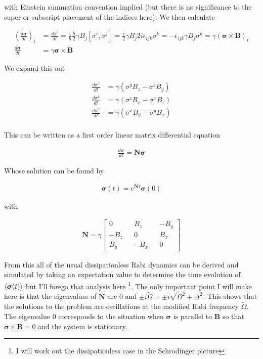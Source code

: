 \documentclass[12pt]{article}
\newcommand{\ddt}[1]{\frac{d #1}{dt}}
\newcommand{\bv}[1]{\boldsymbol{#1}}
\begin{document}
with Einstein summation convention implied (but there is no significance to the super or subscript placement of the indices here). We then calculate

\begin{align}
\left(\ddt{\bv{\sigma}}\right)_i &= \ddt{\sigma^i} = \frac{i}{\hbar}\frac{\hbar}{2}\gamma B_j [\sigma^i,\sigma^j] = \frac{i}{2} \gamma B_j 2i \epsilon_{ijk} \sigma^k = -\epsilon_{ijk} \gamma B_j  \sigma^k = \gamma\left(\bv{\sigma} \times \bv{B} \right)_i\\
\ddt{\bv{\sigma}} &= \gamma \bv{\sigma}\times \bv{B}
\end{align}

We expand this out

\begin{align}
\ddt{\sigma^x} &= \gamma\left(\sigma^y B_z - \sigma^z B_y \right)\\
\ddt{\sigma^y} &= \gamma\left(\sigma^z B_x - \sigma^x B_z \right)\\
\ddt{\sigma^z} &= \gamma\left(\sigma^x B_y - \sigma^y B_x \right)\\
\end{align}

This can be written as a first order linear matrix differential equation

\begin{align}
\ddt{\bv{\sigma}} = \bv{N} \bv{\sigma}
\end{align}

Whose solution can be found by

\begin{align}
\bv{\sigma}(t) = e^{\bv{N}t} \bv{\sigma}(0)
\end{align}

with

\begin{align}
\bv{N} = \gamma\begin{bmatrix}
0 && B_z && -B_y\\
-B_z && 0 && B_x\\
B_y && -B_x && 0
\end{bmatrix}
\end{align}

From this all of the usual dissipationless Rabi dynamics can be derived and simulated by taking an expectation value to determine the time evolution of $\braket{\bv{\sigma}(t)}$ but I'll forego that analysis here \footnote{I will work out the dissipationless case in the Schrodinger picture}. The only important point I will make here is that the eigenvalues of $\bv{N}$ are $0$ and $\pm i \tilde{\Omega} = \pm i \sqrt{\Omega^2 + \Delta^2}$. This shows that the solutions to the problem are oscillations at the modified Rabi frequency $\tilde{\Omega}$. The eigenvalue $0$ corresponds to the situation when $\bv{\sigma}$ is parallel to $\bv{B}$ so that $\bv{\sigma}\times \bv{B}=0$ and the system is stationary.
\end{document}
